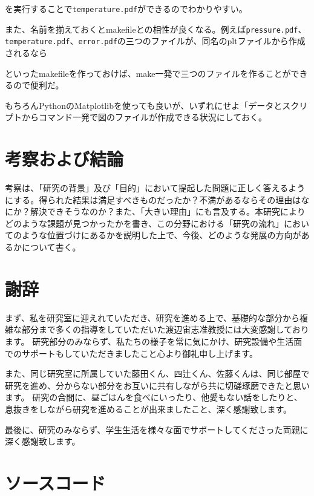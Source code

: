 \documentclass[titlepage]{jsreport}
\begin{document}
を実行することで\verb|temperature.pdf|ができるのでわかりやすい。

また、名前を揃えておくとmakefileとの相性が良くなる。例えば\verb|pressure.pdf|、\verb|temperature.pdf|、\verb|error.pdf|の三つのファイルが、同名のpltファイルから作成されるなら



といったmakefileを作っておけば、make一発で三つのファイルを作ることができるので便利だ。

もちろんPythonのMatplotlibを使っても良いが、いずれにせよ「データとスクリプトからコマンド一発で図のファイルが作成できる状況にしておく。

\chapter{考察および結論} \label{chap:summary}

考察は、「研究の背景」及び「目的」において提起した問題に正しく答えるようにする。得られた結果は満足すべきものだったか？不満があるならその理由はなにか？解決できそうなのか？また、「大きい理由」にも言及する。本研究によりどのような課題が見つかったかを書き、この分野における「研究の流れ」においてのような位置づけにあるかを説明した上で、今後、どのような発展の方向があるかについて書く。

\chapter*{謝辞}

まず、私を研究室に迎えれていただき、研究を進める上で、基礎的な部分から複雑な部分まで多くの指導をしていただいた渡辺宙志准教授には大変感謝しております。
研究部分のみならず、私たちの様子を常に気にかけ、研究設備や生活面でのサポートもしていただきましたこと心より御礼申し上げます。

また、同じ研究室に所属していた藤田くん、四辻くん、佐藤くんは、同じ部屋で研究を進め、分からない部分をお互いに共有しながら共に切磋琢磨できたと思います。
研究の合間に、昼ごはんを食べにいったり、他愛もない話をしたりと、息抜きをしながら研究を進めることが出来ましたこと、深く感謝致します。

最後に、研究のみならず、学生生活を様々な面でサポートしてくださった両親に深く感謝致します。


\appendix

\chapter{ソースコード}





\end{document}
